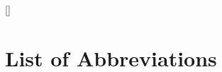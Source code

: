 \documentclass[12pt,a4paper]{report}
\renewcommand{\contentsname}{\textbf{TABLE OF CONTENTS\normalsize\centering}}
\begin{document}
\renewcommand{\contentsname}{\textbf{TABLE OF CONTENTS}}
\tableofcontents

\titleformat{\chapter}[display]{\large\bfseries\raggedright}{\chaptername~\thechapter}{1ex}{}[{\titlerule[1pt]}]

\newpage

\listoffigures

\newpage

\chapter*{List of Abbreviations}
\end{document}

